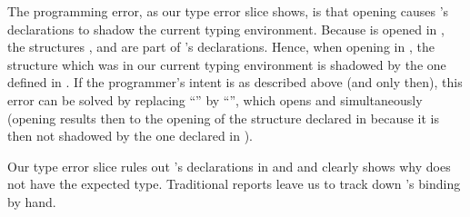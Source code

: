 

The programming error, as our type error slice shows,
is that opening  causes 's
declarations to shadow the current typing environment.
Because
 is opened in , the structures
,  and  are part of
's declarations.  Hence, when opening
 in , the structure
 which was in our current typing environment is
shadowed by the one defined in .
If the programmer's intent is as described above (and only then), this
error can be solved by replacing ``'' by
``'', which opens  and
 simultaneously (opening  results
then to the opening of the structure  declared in
 because it is then not shadowed by the one declared
in ).

Our type error slice rules out 's declarations in
 and  and clearly shows why
 does not have the expected type.  Traditional reports
leave us to track down
's binding by hand.








